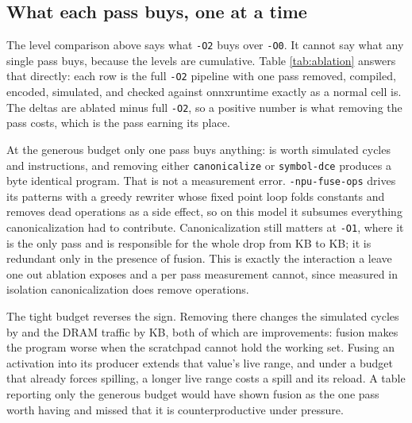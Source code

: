 \subsection{What each pass buys, one at a time}

The level comparison above says what \texttt{-O2} buys over \texttt{-O0}. It
cannot say what any single pass buys, because the levels are cumulative. Table
\ref{tab:ablation} answers that directly: each row is the full \texttt{-O2}
pipeline with one pass removed, compiled, encoded, simulated, and checked
against onnxruntime exactly as a normal cell is. The deltas are ablated minus
full \texttt{-O2}, so a positive number is what removing the pass costs, which
is the pass earning its place.

\begin{table}[h]
  \centering
  
  \caption{Leave one out ablation of every \texttt{-O2} pass, at both scratchpad
  budgets. Instructions, cycles, and DRAM are simulated estimates from the
  analytical cost model, not measurements. Deltas are the ablated pipeline minus
  full \texttt{-O2} at the same budget, so a positive delta means removing the
  pass made the program worse. \texttt{canonicalize} is ablated everywhere it
  appears, which is twice in the \texttt{-O2} pipeline.}
  \label{tab:ablation}
\end{table}

At the generous budget only one pass buys anything: \BestPass{} is worth
\BestPassCycles{} simulated cycles and \BestPassInstrs{} instructions, and
removing either \texttt{canonicalize} or \texttt{symbol-dce} produces a byte
identical program. That is not a measurement error. \texttt{-npu-fuse-ops}
drives its patterns with a greedy rewriter whose fixed point loop folds
constants and removes dead operations as a side effect, so on this model it
subsumes everything canonicalization had to contribute. Canonicalization still
matters at \texttt{-O1}, where it is the only pass and is responsible for the
whole drop from \OaDram{} KB to \ObDram{} KB; it is redundant only in the
presence of fusion. This is exactly the interaction a leave one out ablation
exposes and a per pass measurement cannot, since measured in isolation
canonicalization does remove operations.

The tight budget reverses the sign. Removing \BestPass{} there changes the
simulated cycles by \BestPassTightCycles{} and the DRAM traffic by
\BestPassTightDram{} KB, both of which are improvements: fusion makes the
program worse when the scratchpad cannot hold the working set. Fusing an
activation into its producer extends that value's live range, and under a budget
that already forces spilling, a longer live range costs a spill and its reload.
A table reporting only the generous budget would have shown fusion as the one
pass worth having and missed that it is counterproductive under pressure.

